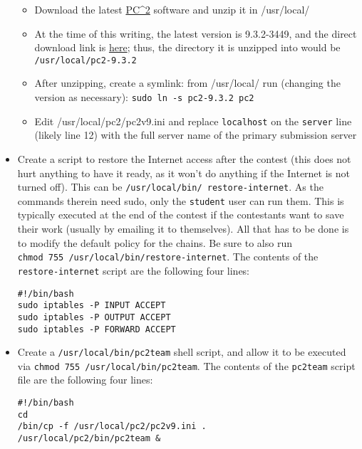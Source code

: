 \begin{itemize}
  \begin{itemize}
    \tightlist
    \item Download the latest \href{http://www.ecs.csus.edu/pc2/}{PC\^{}2}
  software and unzip it in /usr/local/
  \item
    At the time of this writing, the latest version is 9.3.2-3449, and
    the direct download link is
    \href{http://www.ecs.csus.edu/pc2/code/v9/pc2-9.3.2-3449/pc2-9.3.2-3449.zip}{here};
    thus, the directory it is unzipped into would be
    \texttt{/usr/local/pc2-9.3.2}
  \item
    After unzipping, create a symlink: from /usr/local/ run (changing
    the version as necessary): \texttt{sudo\ ln\ -s\ pc2-9.3.2\ pc2}
  \item
    Edit /usr/local/pc2/pc2v9.ini and replace \texttt{localhost} on the
    \texttt{server} line (likely line 12) with the full server name of
    the primary submission server
  \end{itemize}
\item
  Create a script to restore the Internet access after the contest
  (this does not hurt anything to have it ready, as it won't do
  anything if the Internet is not turned off). This can be
  \texttt{/usr/local/bin/ restore-internet}.  As the commands therein
  need sudo, only the \texttt{student} user can run them. This is
  typically executed at the end of the contest if the contestants want
  to save their work (usually by emailing it to themselves). All that
  has to be done is to modify the default policy for the chains. Be
  sure to also run
  \texttt{chmod\ 755\ /usr/local/bin/restore-internet}.  The contents
  of the {\tt restore-internet} script are the following four lines:

\begin{verbatim}
#!/bin/bash
sudo iptables -P INPUT ACCEPT
sudo iptables -P OUTPUT ACCEPT
sudo iptables -P FORWARD ACCEPT
\end{verbatim}
\item
  Create a \texttt{/usr/local/bin/pc2team} shell script, and allow it
  to be executed via {\tt chmod 755 /usr/local/bin/pc2team}.  The
  contents of the {\tt pc2team} script file are the following four
  lines:

\begin{verbatim}
#!/bin/bash
cd
/bin/cp -f /usr/local/pc2/pc2v9.ini .
/usr/local/pc2/bin/pc2team &
\end{verbatim}
\end{itemize}

